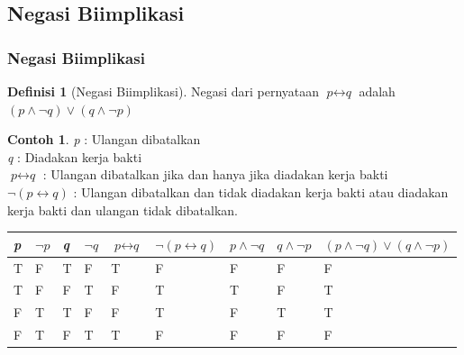 \documentclass[handout]{beamer}
\theoremstyle{definition}
\newtheorem{definisi}[theorem]{Definisi}
\theoremstyle{example}
\newtheorem{contoh}[theorem]{Contoh}
\begin{document}
\subsection{Negasi Biimplikasi}
\begin{frame}[shrink]
	\frametitle{Negasi Biimplikasi}
\begin{definisi}[Negasi Biimplikasi]
	Negasi dari pernyataan $\textit{p}\leftrightarrow\textit{q}$  adalah $(\textit{p}\wedge\neg\textit{q})\vee(\textit{q}\wedge\neg\textit{p})$    		 	
\end{definisi}
\begin{contoh}
	\textit{p} : Ulangan dibatalkan \\
	\textit{q} : Diadakan kerja bakti \\
	$\textit{p}\leftrightarrow\textit{q}$ : Ulangan dibatalkan jika dan hanya jika diadakan kerja bakti \\
	$\neg(\textit{p}\leftrightarrow\textit{q})$ : Ulangan dibatalkan dan tidak diadakan kerja bakti atau diadakan kerja bakti dan ulangan tidak dibatalkan.	\\
 \tiny{	
	\begin{tabular}{ | l | l | l | l | l | l | l |l |l |}
		\hline
		\textit{p} & $\neg\textit{p}$ & \textit{q} & $\neg\textit{q}$ & $\textit{p}\leftrightarrow\textit{q}$ & $\neg(\textit{p}\leftrightarrow\textit{q})$ & $\textit{p}\wedge\neg\textit{q}$ & $\textit{q}\wedge\neg\textit{p}$ & $(\textit{p}\wedge\neg\textit{q})\vee(\textit{q}\wedge\neg\textit{p})$\\ \hline
		T & F & T & F & T & F & F & F & F\\ \hline
		T & F & F & T & F & T & T & F & T\\ \hline
		F & T & T & F & F & T & F & T & T\\ \hline
		F & T & F & T & T & F & F & F & F\\     		 
		\hline
	\end{tabular}}
\end{contoh}
\end{frame}
\end{document}
